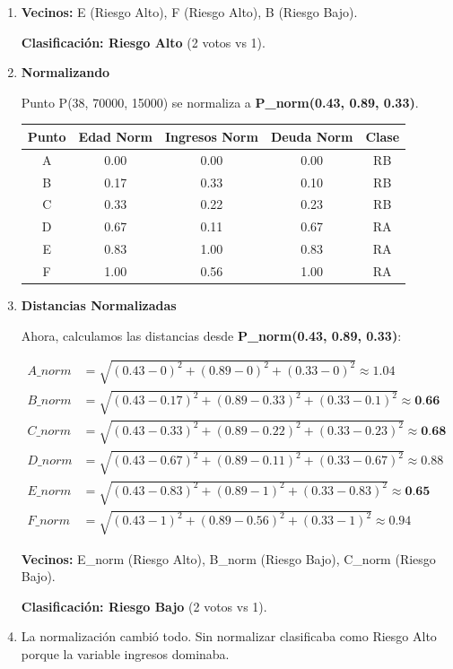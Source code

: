 \documentclass[12pt]{article}
\begin{document}
\begin{enumerate}
    \item \textbf{Vecinos:} E (Riesgo Alto), F (Riesgo Alto), B (Riesgo Bajo).
    
    \textbf{Clasificación: Riesgo Alto} (2 votos vs 1).

    \item \textbf{Normalizando}
    
    Punto P(38, 70000, 15000) se normaliza a \textbf{P\_norm(0.43, 0.89, 0.33)}.

    \begin{table}[H]
    \centering
    \begin{tabular}{ccccc}
        \toprule
        \textbf{Punto} & \textbf{Edad Norm} & \textbf{Ingresos Norm} & \textbf{Deuda Norm} & \textbf{Clase} \\
        \midrule
        A & 0.00 & 0.00 & 0.00 & RB \\
        B & 0.17 & 0.33 & 0.10 & RB \\
        C & 0.33 & 0.22 & 0.23 & RB \\
        D & 0.67 & 0.11 & 0.67 & RA \\
        E & 0.83 & 1.00 & 0.83 & RA \\
        F & 1.00 & 0.56 & 1.00 & RA \\
        \bottomrule
    \end{tabular}
    \end{table}

    \item \textbf{Distancias Normalizadas}

    Ahora, calculamos las distancias desde \textbf{P\_norm(0.43, 0.89, 0.33)}:

    \begin{align*}
        A\_norm &= \sqrt{(0.43-0)^2 + (0.89-0)^2 + (0.33-0)^2} \approx 1.04 \\
        B\_norm &= \sqrt{(0.43-0.17)^2 + (0.89-0.33)^2 + (0.33-0.1)^2} \approx \textbf{0.66} \\
        C\_norm &= \sqrt{(0.43-0.33)^2 + (0.89-0.22)^2 + (0.33-0.23)^2} \approx \textbf{0.68} \\
        D\_norm &= \sqrt{(0.43-0.67)^2 + (0.89-0.11)^2 + (0.33-0.67)^2} \approx 0.88 \\
        E\_norm &= \sqrt{(0.43-0.83)^2 + (0.89-1)^2 + (0.33-0.83)^2} \approx \textbf{0.65} \\
        F\_norm &= \sqrt{(0.43-1)^2 + (0.89-0.56)^2 + (0.33-1)^2} \approx 0.94
    \end{align*}
    
    \textbf{Vecinos:} E\_norm (Riesgo Alto), B\_norm (Riesgo Bajo), C\_norm (Riesgo Bajo).

    \textbf{Clasificación: Riesgo Bajo} (2 votos vs 1).

    \item La normalización cambió todo. Sin normalizar clasificaba como Riesgo Alto porque la variable ingresos dominaba.
    
\end{enumerate}
\end{document}
